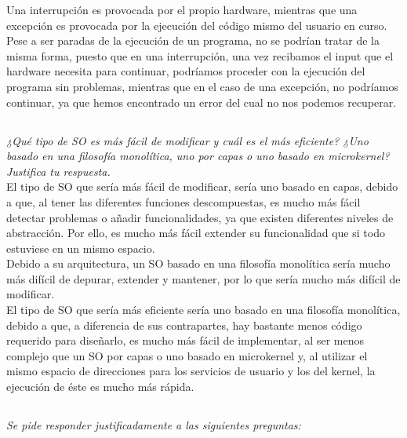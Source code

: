\documentclass[spanish]{article}
\begin{document}
Una interrupción es provocada por el propio hardware,
mientras que una excepción es provocada por la ejecución del
código mismo del usuario en curso.\\

Pese a ser paradas de la ejecución de un programa, no se
podrían tratar de la misma forma, puesto que en una
interrupción, una vez recibamos el input que el hardware
necesita para continuar, podríamos proceder con la ejecución
del programa sin problemas, mientras que en el caso de una
excepción, no podríamos continuar, ya que hemos encontrado
un error del cual no nos podemos recuperar.

\subsection{}

\textit{¿Qué tipo de SO es más fácil de modificar y cuál es
el más eficiente? ¿Uno basado en una filosofía monolítica,
uno por capas o uno basado en microkernel? Justifica tu
respuesta.}\\

El tipo de SO que sería más fácil de modificar, sería uno
basado en capas, debido a que, al tener las diferentes
funciones descompuestas, es mucho más fácil detectar
problemas o añadir funcionalidades, ya que existen
diferentes niveles de abstracción. Por ello, es mucho más
fácil extender su funcionalidad que si todo estuviese en un
mismo espacio.\\

Debido a su arquitectura, un SO basado en una filosofía
monolítica sería mucho más difícil de depurar, extender y
mantener, por lo que sería mucho más difícil de modificar.\\

El tipo de SO que sería más eficiente sería uno basado en
una filosofía monolítica, debido a que, a diferencia de sus
contrapartes, hay bastante menos código requerido para
diseñarlo, es mucho más fácil de implementar, al ser menos
complejo que un SO por capas o uno basado en microkernel y,
al utilizar el mismo espacio de direcciones para los
servicios de usuario y los del kernel, la ejecución de éste
es mucho más rápida.

\subsection{}

\textit{Se pide responder justificadamente a las siguientes
preguntas:}
\end{document}
